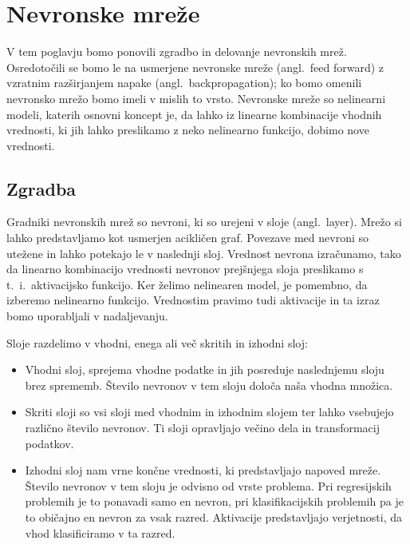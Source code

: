 \chapter{Nevronske mreže}
V tem poglavju bomo ponovili zgradbo in delovanje nevronskih mrež. Osredotočili se bomo le na  usmerjene nevronske mreže (angl.\ feed forward) z vzratnim razširjanjem napake (angl.\ backpropagation); ko bomo omenili nevronsko mrežo bomo imeli v mislih to vrsto.
Nevronske mreže so nelinearni modeli, katerih osnovni koncept je, da lahko iz linearne kombinacije vhodnih vrednosti, ki jih lahko preslikamo z neko nelinearno funkcijo, dobimo nove vrednosti.~\cite{Hastie2009}


\section{Zgradba}
Gradniki nevronskih mrež so nevroni, ki so urejeni v sloje (angl.\ layer).
Mrežo si lahko predstavljamo kot usmerjen acikličen graf. Povezave med nevroni so utežene in lahko potekajo le v naslednji sloj.
Vrednost nevrona izračunamo, tako da linearno kombinacijo vrednosti nevronov prejšnjega sloja preslikamo s t.\ i.\ aktivacijsko funkcijo. Ker želimo nelinearen model, je pomembno, da izberemo nelinearno funkcijo. Vrednostim pravimo tudi aktivacije in ta izraz bomo uporabljali v nadaljevanju.

Sloje razdelimo v vhodni, enega ali več skritih in izhodni sloj:
\begin{itemize}
  \item Vhodni sloj, sprejema vhodne podatke in jih posreduje naslednjemu sloju brez sprememb. Število nevronov v tem sloju določa naša vhodna množica.
  \item Skriti sloji so vsi sloji med vhodnim in izhodnim slojem ter lahko vsebujejo različno število nevronov. Ti sloji opravljajo večino dela in transformacij podatkov.
  \item Izhodni sloj nam vrne končne vrednosti, ki predstavljajo napoved mreže. Število nevronov v tem sloju je odvisno od vrste problema. Pri regresijskih problemih je to ponavadi samo en nevron, pri klasifikacijskih problemih pa je to običajno en nevron za vsak razred. Aktivacije predstavljajo verjetnosti, da vhod klasificiramo v ta razred.
\end{itemize}


